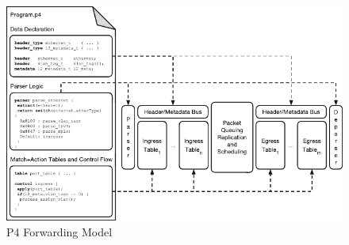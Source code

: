 \begin{figure}[H]
    \caption{P4 Forwarding Model}
    \begin{center}
        \includegraphics[width=1.0\textwidth]{images/p4model.pdf}
    \end{center}
    \label{fig:p4_model}
\end{figure}
